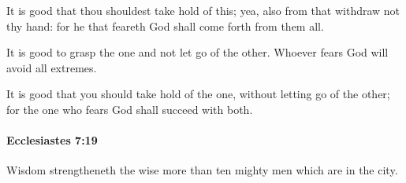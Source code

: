 			\begin{versebox}
					\item[BHS] 
					\item[LXX] 
					\item[ASV] It is good that thou shouldest take hold of this; yea, also from that withdraw not thy hand: for he that feareth God shall come forth from them all.
					\item[NIV] It is good to grasp the one and not let go of the other. Whoever fears God will avoid all extremes.
					\item[NRSV] It is good that you should take hold of the one, without letting go of the other; for the one who fears God shall succeed with both.
			\end{versebox}

		\paragraph{Ecclesiastes 7:19} %
			\label{ECCLESIASTES-7-19}

			Wisdom strengtheneth the wise more than ten mighty men which are in the city.

